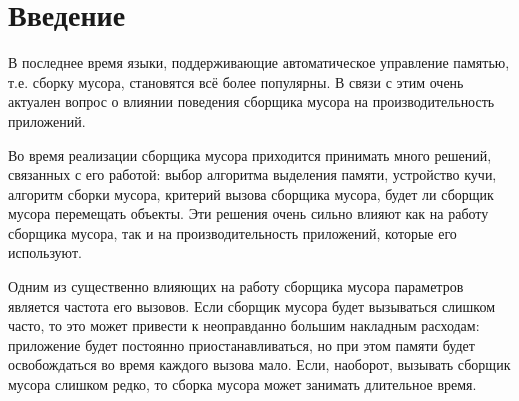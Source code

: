 \documentclass[14pt]{extarticle}
\renewcommand\baselinestretch{1.5}
\begin{document}

\tableofcontents
\thispagestyle{empty} 
\pagebreak
\section*{Введение}

В последнее время языки, поддерживающие автоматическое управление памятью, т.е. сборку 
мусора, становятся всё более популярны. В связи с этим очень актуален вопрос о влиянии
поведения сборщика мусора на производительность приложений.

Во время реализации сборщика мусора приходится принимать много решений,
связанных с его работой: выбор алгоритма выделения памяти, устройство кучи, 
алгоритм сборки мусора, критерий вызова сборщика мусора, будет ли сборщик мусора 
перемещать объекты. Эти решения очень сильно влияют как на работу сборщика мусора, 
так и на
производительность приложений, которые его используют.

Одним из существенно влияющих на работу сборщика мусора параметров
является частота его вызовов. Если 
сборщик мусора будет вызываться слишком часто, то это может привести к неоправданно
большим накладным расходам: приложение будет постоянно приостанавливаться, но при 
этом памяти будет освобождаться во время каждого вызова мало. Если, наоборот, вызывать 
сборщик мусора слишком редко, то сборка мусора может занимать длительное время. 
\end{document}
